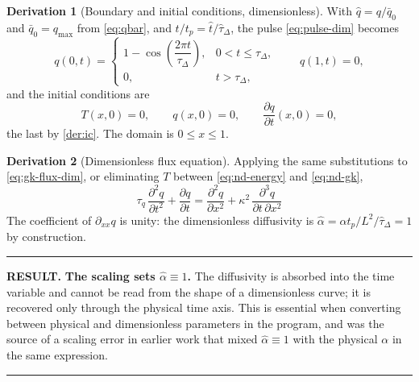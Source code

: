 \documentclass[11pt,a4paper]{article}
\theoremstyle{definition}
\newtheorem{derivationx}{Derivation}[section]
\newenvironment{resultbox}%
  {\par\medskip\noindent\begin{minipage}{\linewidth}%
   \rule{\linewidth}{1.0pt}\par\noindent\textbf{RESULT.}\enspace}%
  {\par\rule{\linewidth}{1.0pt}\end{minipage}\par\medskip}
\newcommand{\tq}{\tau_{q}}
\newcommand{\kk}{\kappa^{2}}
\begin{document}
\begin{derivationx}[Boundary and initial conditions, dimensionless]
\label{der:nd-bcic}
With $\hat q=q/\bar q_{0}$ and $\bar q_{0}=q_{\max}$ from \eqref{eq:qbar}, and
$t/t_{p} = \hat t/\hat\tau_{\Delta}$, the pulse \eqref{eq:pulse-dim} becomes
\begin{equation}
  q(0,t) =
  \begin{cases}
    1-\cos\!\left(\dfrac{2\pi t}{\tau_{\Delta}}\right),
      & 0 < t \leq \tau_{\Delta}, \\[2ex]
    0, & t > \tau_{\Delta},
  \end{cases}
  \qquad
  q(1,t) = 0 ,
  \label{eq:nd-bc}
\end{equation}
and the initial conditions are
\begin{equation}
  T(x,0)=0, \qquad q(x,0)=0, \qquad
  \frac{\partial q}{\partial t}(x,0)=0 ,
  \label{eq:nd-ic}
\end{equation}
the last by \cref{der:ic}. The domain is $0\le x\le 1$.
\end{derivationx}

\begin{derivationx}[Dimensionless flux equation]
\label{der:nd-flux}
Applying the same substitutions to \eqref{eq:gk-flux-dim}, or eliminating $T$
between \eqref{eq:nd-energy} and \eqref{eq:nd-gk},
\begin{equation}
  \boxed{\ \tq\,\frac{\partial^{2}q}{\partial t^{2}}
        + \frac{\partial q}{\partial t}
        = \frac{\partial^{2}q}{\partial x^{2}}
        + \kk\,\frac{\partial^{3}q}{\partial t\,\partial x^{2}}\ }
  \label{eq:nd-flux}
\end{equation}
The coefficient of $\partial_{xx}q$ is unity: the dimensionless diffusivity is
$\hat\alpha=\alpha t_{p}/L^{2}\big/\hat\tau_{\Delta}=1$ by construction.
\end{derivationx}

\begin{resultbox}
\textbf{The scaling sets $\hat\alpha\equiv1$.} The diffusivity is absorbed into
the time variable and cannot be read from the shape of a dimensionless curve;
it is recovered only through the physical time axis. This is essential when
converting between physical and dimensionless parameters in the program, and
was the source of a scaling error in earlier work that mixed
$\hat\alpha\equiv1$ with the physical $\alpha$ in the same expression.
\end{resultbox}
\end{document}
